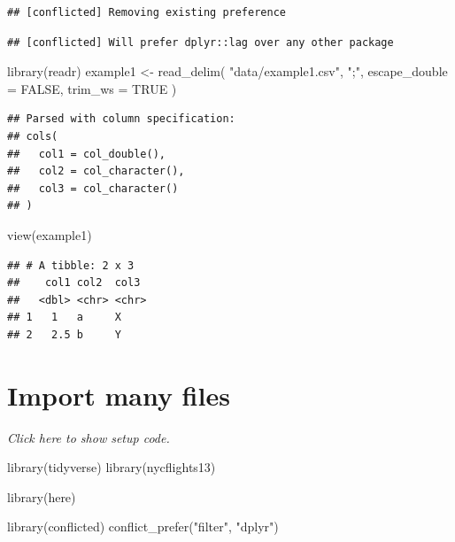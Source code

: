 \documentclass[]{book}
\newenvironment{Shaded}{}{}
\newcommand{\DataTypeTok}[1]{#1}
\newcommand{\KeywordTok}[1]{\textcolor[rgb]{0.00,0.00,1.00}{#1}}
\newcommand{\NormalTok}[1]{#1}
\newcommand{\OtherTok}[1]{\textcolor[rgb]{1.00,0.25,0.00}{#1}}
\newcommand{\StringTok}[1]{\textcolor[rgb]{0.00,0.50,0.50}{#1}}
\begin{document}
\begin{verbatim}
## [conflicted] Removing existing preference
\end{verbatim}

\begin{verbatim}
## [conflicted] Will prefer dplyr::lag over any other package
\end{verbatim}

\begin{Shaded}
\begin{Highlighting}[]
\KeywordTok{library}\NormalTok{(readr)}
\NormalTok{example1 <-}
\StringTok{  }\KeywordTok{read_delim}\NormalTok{(}
    \StringTok{"data/example1.csv"}\NormalTok{,}
    \StringTok{";"}\NormalTok{,}
    \DataTypeTok{escape_double =} \OtherTok{FALSE}\NormalTok{, }\DataTypeTok{trim_ws =} \OtherTok{TRUE}
\NormalTok{  )}
\end{Highlighting}
\end{Shaded}

\begin{verbatim}
## Parsed with column specification:
## cols(
##   col1 = col_double(),
##   col2 = col_character(),
##   col3 = col_character()
## )
\end{verbatim}

\begin{Shaded}
\begin{Highlighting}[]
\KeywordTok{view}\NormalTok{(example1)}
\end{Highlighting}
\end{Shaded}

\begin{verbatim}
## # A tibble: 2 x 3
##    col1 col2  col3 
##   <dbl> <chr> <chr>
## 1   1   a     X    
## 2   2.5 b     Y
\end{verbatim}

\hypertarget{import-many-files}{%
\section{Import many files}\label{import-many-files}}

\emph{Click here to show setup code.}

\begin{Shaded}
\begin{Highlighting}[]
\KeywordTok{library}\NormalTok{(tidyverse)}
\KeywordTok{library}\NormalTok{(nycflights13)}

\KeywordTok{library}\NormalTok{(here)}

\KeywordTok{library}\NormalTok{(conflicted)}
\KeywordTok{conflict_prefer}\NormalTok{(}\StringTok{"filter"}\NormalTok{, }\StringTok{"dplyr"}\NormalTok{)}
\end{Highlighting}
\end{Shaded}
\end{document}
